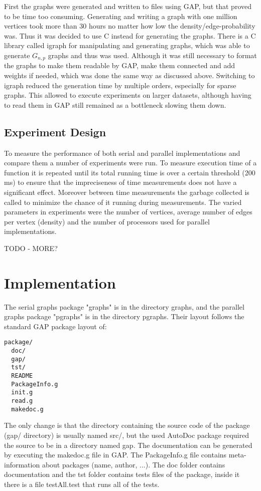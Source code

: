 \documentclass{report}
\theoremstyle{plain}
\theoremstyle{definition}
\theoremstyle{remark}
\begin{document}
First the graphs were generated and written to files using GAP, but that proved to be time too consuming. Generating and writing a graph with one million vertices took more than 30 hours no matter how low the density/edge-probability was. Thus it was decided to use C instead for generating the graphs. There is a C library called igraph for manipulating and generating graphs, which was able to generate $G_{n,p}$ graphs and thus was used. Although it was still necessary to format the graphs to make them readable by GAP, make them connected and add weights if needed, which was done the same way as discussed above. Switching to igraph reduced the generation time by multiple orders, especially for sparse graphs. This allowed to execute experiments on larger datasets, although having to read them in GAP still remained as a bottleneck slowing them down.

\subsection{Experiment Design}

To measure the performance of both serial and parallel implementations and compare them a number of experiments were run. To measure execution time of a function it is repeated until its total running time is over a certain threshold (200 ms) to ensure that the impreciseness of time measurements does not have a significant effect. Moreover between time measurements the garbage collected is called to minimize the chance of it running during measurements. The varied parameters in experiments were the number of vertices, average number of edges per vertex (density) and the number of processors used for parallel implementations.

TODO - MORE?

\section{Implementation}

The serial graphs package "graphs" is in the directory graphs, and the parallel graphs package "pgraphs" is in the directory pgraphs. Their layout follows the standard GAP package layout of:

\begin{lstlisting}
package/
  doc/
  gap/
  tst/
  README
  PackageInfo.g
  init.g
  read.g
  makedoc.g
\end{lstlisting}

The only change is that the directory containing the source code of the package (gap/ directory) is usually named src/, but the used AutoDoc package required the source to be in a directory named gap. The documentation can be generated by executing the makedoc.g file in GAP.
The PackageInfo.g file contains meta-information about packages (name, author, ...). The doc folder contains documentation and the tst folder contains tests files of the package, inside it there is a file testAll.test that runs all of the tests.
\end{document}

